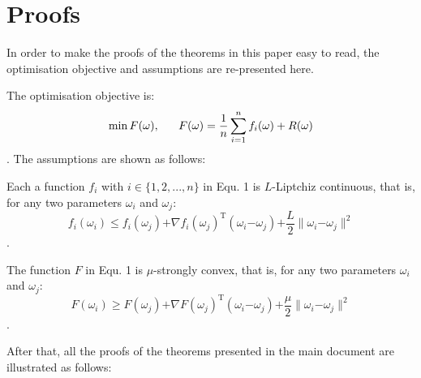 \documentclass[letterpaper]{article}
\begin{document}
\section{Proofs}
\label{sect_proofs}
In order to make the proofs of the theorems in this paper easy to read, the optimisation objective and assumptions are re-presented here. 

The optimisation objective is:
\begin{equation}
\label{equa_loss_minimization}
\min F(\omega),~~~~~F(\omega)=\frac{1}{n}\sum\limits_{i=1}^n f_i(\omega)+R(\omega)\\
\end{equation}. The assumptions are shown as follows:


\begin{Assumption}
Each a function $f_i$ with $i\in\{1,2, ..., n\}$ in Equ. 1 is $L$-Liptchiz continuous, that is, for any two parameters $\omega_i$ and $\omega_j$:
\label{assumption_liptchiz}
\begin{equation}
\label{equa_l_smooth} 
f_i(\omega_i)\le f_i(\omega_j)\mathrm{+}\nabla f_i(\omega_j)^\mathrm{T} (\omega_i\mathrm{-}\omega_j)\mathrm{+}\frac{L}{2}\parallel \omega_i\mathrm{-}\omega_j\parallel^2
 \end{equation}.

\end{Assumption}

\begin{Assumption}
\label{assumption_strongly_convex}
The function $F$ in Equ. 1 is $\mu$-strongly convex, that is, for any two parameters $\omega_i$ and $\omega_j$:
\begin{equation}
\label{equa_gamma_convex} 
F(\omega_i)\ge F(\omega_j)\mathrm{+}\nabla F(\omega_j)^\mathrm{T} (\omega_i\mathrm{-}\omega_j)\mathrm{+}\frac{\mu}{2}\parallel \omega_i\mathrm{-}\omega_j\parallel^2
\end{equation}.

\end{Assumption}

After that, all the proofs of the theorems presented in the main document are illustrated as follows:
\end{document}
